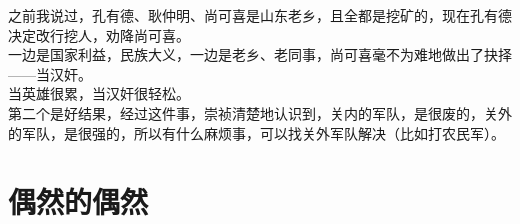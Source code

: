 \begin{multicols}{\theparacolNo}
之前我说过，孔有德、耿仲明、尚可喜是山东老乡，且全都是挖矿的，现在孔有德决定改行挖人，劝降尚可喜。\\

一边是国家利益，民族大义，一边是老乡、老同事，尚可喜毫不为难地做出了抉择——当汉奸。\\

当英雄很累，当汉奸很轻松。\\

第二个是好结果，经过这件事，崇祯清楚地认识到，关内的军队，是很废的，关外的军队，是很强的，所以有什么麻烦事，可以找关外军队解决（比如打农民军）。\\
\ifnum{}
	\end{multicols}
\fi
\newpage
\section{偶然的偶然}
\ifnum{}
